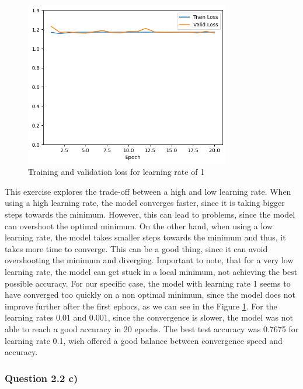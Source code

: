\documentclass{article}
\begin{document}
\begin{figure}[H]
    \centering
    \includegraphics[width=0.8\textwidth]{"plots/mlp-training-loss-batch-16-lr-1.0-epochs-20-hidden-200-dropout-0.0-l2-0-layers-2-act-relu-opt-sgd.png"}
    \caption{Training and validation loss for learning rate of 1}
    \label{2.2b learning rate 1}
\end{figure}

This exercise explores the trade-off between a high and low learning rate. When using a high learning rate, the model converges faster, since it is taking bigger steps towards the minimum. 
However, this can lead to problems, since the model can overshoot the optimal minimum. On the other hand, when using a low learning rate, the model takes smaller steps towards 
the minimum and thus, it takes more time to converge. This can be a good thing, since it can avoid overshooting the minimum and diverging. Important to note, that for a very low learning rate,
the model can get stuck in a local minimum, not achieving the best possible accuracy. For our specific case, the model with learning rate 1 seems to have converged too quickly on a non optimal minimum,
since the model does not improve further after the first ephocs, as we can see in the Figure \ref{2.2b learning rate 1}. For the learning rates 0.01 and 0.001, since the convergence is slower, 
the model was not able to reach a good accuracy in 20 epochs. The best test accuracy was 0.7675 for learning rate 0.1, wich offered a good balance between convergence speed and accuracy.

\subsubsection{Question 2.2 c)}
\end{document}
